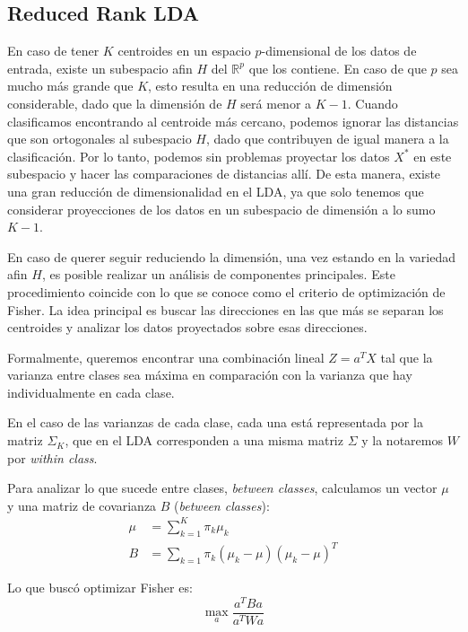 \documentclass[aps,onecolumn,12pt,notitlepage]{revtex4-1}
\begin{document}
\subsection{Reduced Rank LDA}

En caso de tener $K$ centroides en un espacio $p$-dimensional de los datos de entrada, existe un subespacio afin $H$ del $\mathbb{R}^{p}$ que los contiene. En caso de que $p$ sea mucho más grande que $K$, esto resulta en una reducción de dimensión considerable, dado que la dimensión de $H$ será menor a $K-1$. Cuando clasificamos encontrando al centroide más cercano, podemos ignorar las distancias que son ortogonales al subespacio $H$, dado que contribuyen de igual manera a la clasificación. Por lo tanto, podemos sin problemas proyectar los datos $X^{*}$ en este subespacio y hacer las comparaciones de distancias allí. De esta manera, existe una gran reducción de dimensionalidad en el LDA, ya que solo tenemos que considerar proyecciones de los datos en un subespacio de dimensión a lo sumo $K-1$.

En caso de querer seguir reduciendo la dimensión, una vez estando en la variedad afin $H$, es posible realizar un análisis de componentes principales. Este procedimiento coincide con lo que se conoce como el criterio de optimización de Fisher. La idea principal es buscar las direcciones en las que más se separan los centroides y analizar los datos proyectados sobre esas direcciones.

Formalmente, queremos encontrar una combinación lineal $Z = a^{T}X$ tal que la varianza entre clases sea máxima en comparación con la varianza que hay individualmente en cada clase.

En el caso de las varianzas de cada clase, cada una está representada por la matriz $\Sigma_{K}$, que en el LDA corresponden a una misma matriz $\Sigma$ y la notaremos $W$ por \textit{within class}.

Para analizar lo que sucede entre clases, \textit{between classes}, calculamos un vector $\mu$ y una matriz de covarianza $B$ (\textit{between classes}):
\begin{align}
\mu &= \sum_{k=1}^{K} \pi_{k} \mu_{k}\\
B &= \sum_{k=1} \pi_{k} (\mu_k-\mu)(\mu_k-\mu)^{T}
\end{align}

Lo que buscó optimizar Fisher es:
\begin{equation}
\max_{a} \frac{a^{T} B a}{a^{T} W a}
\end{equation}
\end{document}
